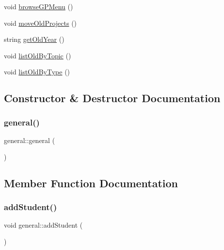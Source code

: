 \begin{DoxyCompactItemize}
$$\item 
void \hyperlink{classgeneral_aaecf57259d31156270464e3b738ad54a}{browse\+G\+P\+Menu} ()
\item 
void \hyperlink{classgeneral_a75f3d042e36e0d2006e543cc1be50e99}{move\+Old\+Projects} ()
\item 
string \hyperlink{classgeneral_a8b4c7609872e3559702838a12f210742}{get\+Old\+Year} ()
\item 
void \hyperlink{classgeneral_a9b807786a1b42c2b779ad70b087a8639}{list\+Old\+By\+Topic} ()
\item 
void \hyperlink{classgeneral_a5e876d3404285e2c89ea7969c964600d}{list\+Old\+By\+Type} ()
\end{DoxyCompactItemize}


\subsection{Constructor \& Destructor Documentation}
\mbox{\label{classgeneral_a2a4fcaecb7d07e416a1188dee4fee767}} 
\subsubsection{\texorpdfstring{general()}{general()}}
{\footnotesize\ttfamily general\+::general (\begin{DoxyParamCaption}{ }\end{DoxyParamCaption})\hspace{0.3cm}{\ttfamily [inline]}}



\subsection{Member Function Documentation}
\mbox{\label{classgeneral_a981fdd9aa5bca7fc3b997e328eeb2f64}} 
\subsubsection{\texorpdfstring{add\+Student()}{addStudent()}}
{\footnotesize\ttfamily void general\+::add\+Student (\begin{DoxyParamCaption}{ }\end{DoxyParamCaption})}


